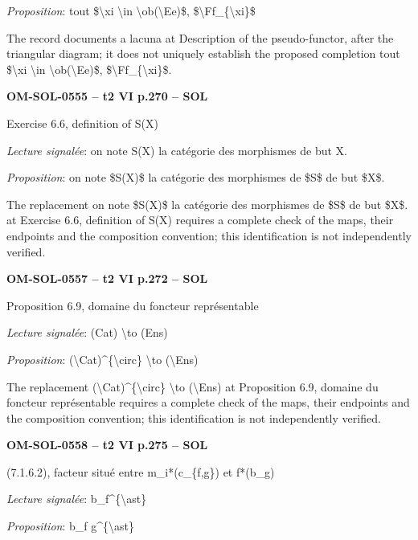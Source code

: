 \emph{Proposition}: tout \$\textbackslash{}xi \textbackslash{}in \textbackslash{}ob(\textbackslash{}Ee)\$, \$\textbackslash{}Ff\_\{\textbackslash{}xi\}\$\par
The record documents a lacuna at Description of the pseudo-functor, after the triangular diagram; it does not uniquely establish the proposed completion tout \$\textbackslash{}xi \textbackslash{}in \textbackslash{}ob(\textbackslash{}Ee)\$, \$\textbackslash{}Ff\_\{\textbackslash{}xi\}\$.\par
\par\noindent\textbf{OM-SOL-0555 -- t2 VI p.270 -- SOL}\par
Exercise 6.6, definition of S(X)\par
\emph{Lecture signalée}: on note S(X) la catégorie des morphismes de but X.\par
\emph{Proposition}: on note \$S(X)\$ la catégorie des morphismes de \$S\$ de but \$X\$.\par
The replacement on note \$S(X)\$ la catégorie des morphismes de \$S\$ de but \$X\$. at Exercise 6.6, definition of S(X) requires a complete check of the maps, their endpoints and the composition convention; this identification is not independently verified.\par
\par\noindent\textbf{OM-SOL-0557 -- t2 VI p.272 -- SOL}\par
Proposition 6.9, domaine du foncteur représentable\par
\emph{Lecture signalée}: (Cat) \textbackslash{}to (Ens)\par
\emph{Proposition}: (\textbackslash{}Cat)\textasciicircum{}\{\textbackslash{}circ\} \textbackslash{}to (\textbackslash{}Ens)\par
The replacement (\textbackslash{}Cat)\textasciicircum{}\{\textbackslash{}circ\} \textbackslash{}to (\textbackslash{}Ens) at Proposition 6.9, domaine du foncteur représentable requires a complete check of the maps, their endpoints and the composition convention; this identification is not independently verified.\par
\par\noindent\textbf{OM-SOL-0558 -- t2 VI p.275 -- SOL}\par
(7.1.6.2), facteur situé entre m\_i*(c\_\{f,g\}) et f*(b\_g)\par
\emph{Lecture signalée}: b\_f\textasciicircum{}\{\textbackslash{}ast\}\par
\emph{Proposition}: b\_f g\textasciicircum{}\{\textbackslash{}ast\}\par
